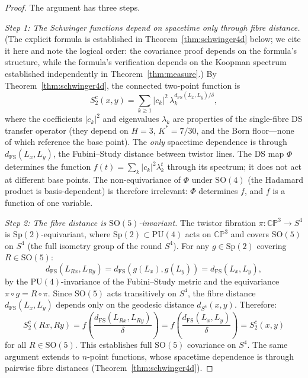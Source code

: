 \documentclass[11pt,a4paper]{article}
\theoremstyle{definition}
\theoremstyle{remark}
\newcommand{\CP}{\mathbb{CP}}
\begin{document}
\begin{proof}
The argument has three steps.

\emph{Step 1: The Schwinger functions depend on spacetime only through fibre distance.} (The explicit formula is established in Theorem~\ref{thm:schwinger4d} below; we cite it here and note the logical order: the covariance proof depends on the formula's structure, while the formula's verification depends on the Koopman spectrum established independently in Theorem~\ref{thm:measure}.) By Theorem~\ref{thm:schwinger4d}, the connected two-point function is
\[
S_2^c(x,y)=\sum_{k\geq 1}|c_k|^2\,\lambda_k^{d_{\mathrm{FS}}(L_x,L_y)/\delta},
\]
where the coefficients $|c_k|^2$ and eigenvalues $\lambda_k$ are properties of the single-fibre DS transfer operator (they depend on $H=3$, $K^*=7/30$, and the Born floor---none of which reference the base point). The \emph{only} spacetime dependence is through $d_{\mathrm{FS}}(L_x,L_y)$, the Fubini--Study distance between twistor lines. The DS map $\Phi$ determines the function $f(t)=\sum_k|c_k|^2\lambda_k^t$ through its spectrum; it does not act at different base points. The non-equivariance of $\Phi$ under $\mathrm{SO}(4)$ (the Hadamard product is basis-dependent) is therefore irrelevant: $\Phi$ determines $f$, and $f$ is a function of one variable.

\emph{Step 2: The fibre distance is $\mathrm{SO}(5)$-invariant.} The twistor fibration $\pi:\CP^3\to S^4$ is $\mathrm{Sp}(2)$-equivariant, where $\mathrm{Sp}(2)\subset\mathrm{PU}(4)$ acts on $\CP^3$ and covers $\mathrm{SO}(5)$ on $S^4$ (the full isometry group of the round $S^4$). For any $g\in\mathrm{Sp}(2)$ covering $R\in\mathrm{SO}(5)$:
\[
d_{\mathrm{FS}}(L_{Rx},L_{Ry})=d_{\mathrm{FS}}(g(L_x),g(L_y))=d_{\mathrm{FS}}(L_x,L_y),
\]
by the $\mathrm{PU}(4)$-invariance of the Fubini--Study metric and the equivariance $\pi\circ g=R\circ\pi$. Since $\mathrm{SO}(5)$ acts transitively on $S^4$, the fibre distance $d_{\mathrm{FS}}(L_x,L_y)$ depends only on the geodesic distance $d_{S^4}(x,y)$. Therefore:
\[
S_2^c(Rx,Ry)=f\!\left(\frac{d_{\mathrm{FS}}(L_{Rx},L_{Ry})}{\delta}\right)=f\!\left(\frac{d_{\mathrm{FS}}(L_x,L_y)}{\delta}\right)=S_2^c(x,y)
\]
for all $R\in\mathrm{SO}(5)$. This establishes full $\mathrm{SO}(5)$ covariance on $S^4$. The same argument extends to $n$-point functions, whose spacetime dependence is through pairwise fibre distances (Theorem~\ref{thm:schwinger4d}).


\end{proof}
\end{document}
